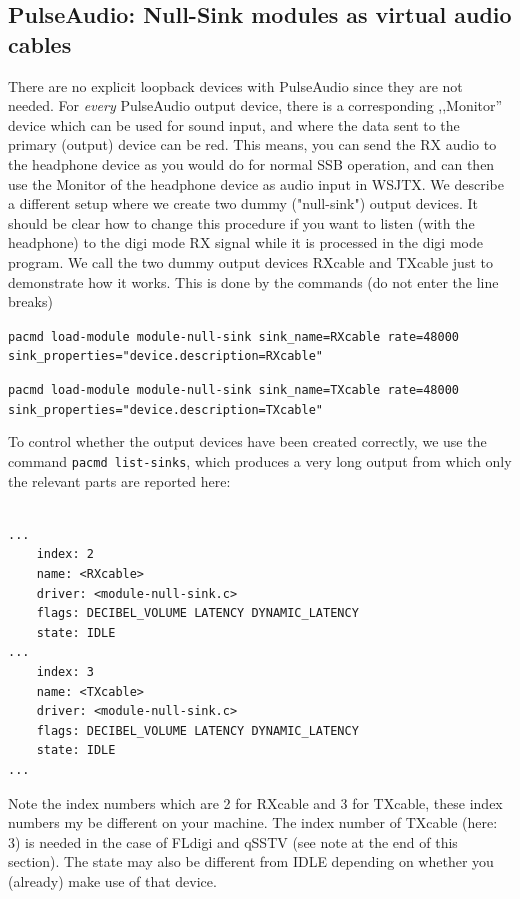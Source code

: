 \documentclass[12pt]{book}
\begin{document}
\subsection[PulseAudio: NullSink modules]{PulseAudio: Null-Sink modules as virtual audio cables}
There are no explicit loopback devices with PulseAudio since they are not needed.
For \textit{every} PulseAudio output device, there is a corresponding ,,Monitor'' device
which can be used for sound input, and where the data sent to the primary (output) device
can be red. This means, you can send the RX audio to the headphone device as you would do
for normal SSB operation, and can then use the Monitor of the headphone device as audio
input in WSJTX. We describe a different setup where we create two dummy
 ("null-sink") output devices. It should be clear how to change this procedure if
 you want to listen (with the headphone) to the digi mode RX signal while it is processed
 in the digi mode program.  We call the two dummy output devices
 RXcable and TXcable just to demonstrate how it works.
  This is done by the commands (do not enter the line breaks)

\texttt{pacmd load-module module-null-sink sink\_name=RXcable rate=48000 \\
sink\_properties="device.description=RXcable"
}

\texttt{pacmd load-module module-null-sink sink\_name=TXcable rate=48000 \\
sink\_properties="device.description=TXcable"
}

To control whether the output devices have been created correctly, we use the command
\texttt{pacmd list-sinks}, which produces
a very long output from which only the relevant parts are reported here:

\begin{small}
\begin{verbatim}

...
    index: 2
	name: <RXcable>
	driver: <module-null-sink.c>
	flags: DECIBEL_VOLUME LATENCY DYNAMIC_LATENCY
	state: IDLE
...
    index: 3
	name: <TXcable>
	driver: <module-null-sink.c>
	flags: DECIBEL_VOLUME LATENCY DYNAMIC_LATENCY
	state: IDLE
...
\end{verbatim}
\end{small}

Note the index numbers which are 2 for RXcable and 3 for TXcable, these index numbers my
be different on your machine. The index number of TXcable (here: 3) is needed in the
case of FLdigi and qSSTV (see note at the end of this section).
The state may also be different from IDLE depending on whether
you (already) make use of that device.
\end{document}
